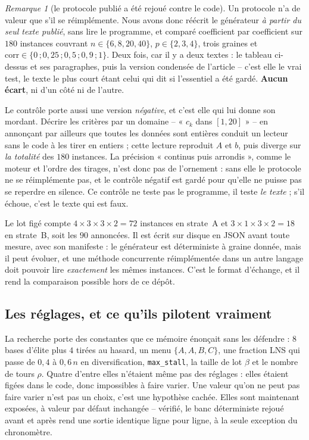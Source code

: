 \documentclass[11pt,a4paper]{article}
\theoremstyle{plain}
\theoremstyle{remark}
\newtheorem{remark}{Remarque}
\begin{document}
\begin{remark}[le protocole publié a été rejoué contre le code]
Un protocole n'a de valeur que s'il se réimplémente. Nous avons donc réécrit
le générateur \emph{à partir du seul texte publié}, sans lire le programme,
et comparé coefficient par coefficient sur $180$ instances couvrant
$n\in\{6,8,20,40\}$, $p\in\{2,3,4\}$, trois graines et
$\text{corr}\in\{0\,;0{,}25\,;0{,}5\,;0{,}9\,;1\}$. Deux fois, car il y a
deux textes : le tableau ci-dessus et ses paragraphes, puis la version
condensée de l'article -- c'est elle le vrai test, le texte le plus court
étant celui qui dit si l'essentiel a été gardé. \textbf{Aucun écart}, ni
d'un côté ni de l'autre.

Le contrôle porte aussi une version \emph{négative}, et c'est elle qui lui
donne son mordant. Décrire les critères par un domaine -- « $c_k$ dans
$[1,20]$ » -- en annonçant par ailleurs que toutes les données sont
entières conduit un lecteur sans le code à les tirer en entiers ; cette
lecture reproduit $A$ et $b$, puis diverge sur \emph{la totalité} des $180$
instances. La précision « continus puis arrondis », comme le moteur et
l'ordre des tirages, n'est donc pas de l'ornement : sans elle le protocole
ne se réimplémente pas, et le contrôle négatif est gardé pour qu'elle ne
puisse pas se reperdre en silence. Ce contrôle ne teste pas le programme, il
teste \emph{le texte} ; s'il échoue, c'est le texte qui est faux.
\end{remark}

\noindent
Le lot figé compte $4\times 3\times 3\times 2=72$ instances en strate~A et
$3\times 1\times 3\times 2=18$ en strate~B, soit les $90$ annoncées. Il est
écrit sur disque en JSON avant toute mesure, avec son manifeste : le
générateur est déterministe à graine donnée, mais il peut évoluer, et une
méthode concurrente réimplémentée dans un autre langage doit pouvoir lire
\emph{exactement} les mêmes instances. C'est le format d'échange, et il rend
la comparaison possible hors de ce dépôt.

\subsection{Les réglages, et ce qu'ils pilotent vraiment}
\label{sec:sensibilite}

La recherche porte des constantes que ce mémoire énonçait sans les
défendre : $8$ bases d'élite plus $4$ tirées au hasard, un menu
$\{A,A,B,C\}$, une fraction LNS qui passe de $0{,}4$ à $0{,}6\,n$ en
diversification, \texttt{max\_stall}, la taille de lot $\beta$ et le nombre
de tours $\rho$. Quatre d'entre elles n'étaient même pas des réglages :
elles étaient figées dans le code, donc impossibles à faire varier. Une
valeur qu'on ne peut pas faire varier n'est pas un choix, c'est une
hypothèse cachée. Elles sont maintenant exposées, à valeur par défaut
inchangée -- vérifié, le banc déterministe rejoué avant et après rend une
sortie identique ligne pour ligne, à la seule exception du chronomètre.
\end{document}
